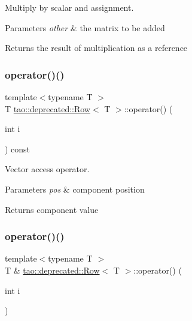 Multiply by scalar and assignment. 


\begin{DoxyParams}{Parameters}
{\em other} & the matrix to be added \\
\hline
\end{DoxyParams}
\begin{DoxyReturn}{Returns}
the result of multiplication as a reference 
\end{DoxyReturn}
\mbox{\label{classtao_1_1deprecated_1_1_row_abf8099cac43814ff7407d7e3030fbce6}} 
\subsubsection{\texorpdfstring{operator()()}{operator()()}\hspace{0.1cm}{\footnotesize\ttfamily [1/2]}}
{\footnotesize\ttfamily template$<$typename T $>$ \\
T \mbox{\hyperlink{classtao_1_1deprecated_1_1_row}{tao\+::deprecated\+::\+Row}}$<$ T $>$\+::operator() (\begin{DoxyParamCaption}\item[{int}]{i }\end{DoxyParamCaption}) const}



Vector access operator. 


\begin{DoxyParams}{Parameters}
{\em pos} & component position \\
\hline
\end{DoxyParams}
\begin{DoxyReturn}{Returns}
component value 
\end{DoxyReturn}
\mbox{\label{classtao_1_1deprecated_1_1_row_a6f39a8e3d788cb9ee94a3dd8b7b9d110}} 
\subsubsection{\texorpdfstring{operator()()}{operator()()}\hspace{0.1cm}{\footnotesize\ttfamily [2/2]}}
{\footnotesize\ttfamily template$<$typename T $>$ \\
T \& \mbox{\hyperlink{classtao_1_1deprecated_1_1_row}{tao\+::deprecated\+::\+Row}}$<$ T $>$\+::operator() (\begin{DoxyParamCaption}\item[{int}]{i }\end{DoxyParamCaption})}



